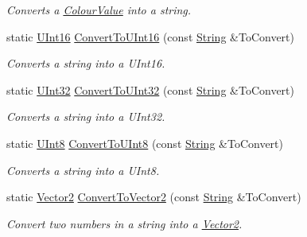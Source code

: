 \begin{DoxyCompactItemize}
\begin{DoxyCompactList}\small\item\em Converts a \hyperlink{classMezzanine_1_1ColourValue}{ColourValue} into a string. \item\end{DoxyCompactList}\item 
static \hyperlink{namespaceMezzanine_a1b6c09063432c7ddd87011c88306c767}{UInt16} \hyperlink{classMezzanine_1_1StringTool_aea8c4a2ef3aa12379c44a482408be2da}{ConvertToUInt16} (const \hyperlink{namespaceMezzanine_acf9fcc130e6ebf08e3d8491aebcf1c86}{String} \&ToConvert)
\begin{DoxyCompactList}\small\item\em Converts a string into a UInt16. \item\end{DoxyCompactList}\item 
static \hyperlink{namespaceMezzanine_abea3b8e8e9b03d2547b2800284ba682d}{UInt32} \hyperlink{classMezzanine_1_1StringTool_abd24055ae24d4b2cc1a586659d89a996}{ConvertToUInt32} (const \hyperlink{namespaceMezzanine_acf9fcc130e6ebf08e3d8491aebcf1c86}{String} \&ToConvert)
\begin{DoxyCompactList}\small\item\em Converts a string into a UInt32. \item\end{DoxyCompactList}\item 
static \hyperlink{namespaceMezzanine_aa5f38583d9025e05fa33d6e32e97b457}{UInt8} \hyperlink{classMezzanine_1_1StringTool_a89cf53c1709dd4e946d1ec4d201e2c4c}{ConvertToUInt8} (const \hyperlink{namespaceMezzanine_acf9fcc130e6ebf08e3d8491aebcf1c86}{String} \&ToConvert)
\begin{DoxyCompactList}\small\item\em Converts a string into a UInt8. \item\end{DoxyCompactList}\item 
static \hyperlink{classMezzanine_1_1Vector2}{Vector2} \hyperlink{classMezzanine_1_1StringTool_a85fd0b8b7cd86ceb467e4d00d862adfa}{ConvertToVector2} (const \hyperlink{namespaceMezzanine_acf9fcc130e6ebf08e3d8491aebcf1c86}{String} \&ToConvert)
\begin{DoxyCompactList}\small\item\em Convert two numbers in a string into a \hyperlink{classMezzanine_1_1Vector2}{Vector2}. \item\end{DoxyCompactList}\item 

\end{DoxyCompactItemize}
